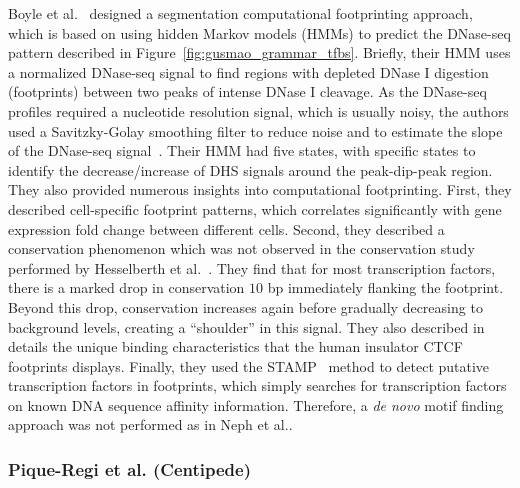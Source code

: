 Boyle et al.~\cite{boyle2011} designed a segmentation computational footprinting approach, which is based on using hidden Markov models (HMMs) to predict the DNase-seq pattern described in Figure~\ref{fig:gusmao_grammar_tfbs}. Briefly, their HMM uses a normalized DNase-seq signal to find regions with depleted DNase I digestion (footprints) between two peaks of intense DNase I cleavage. As the DNase-seq profiles required a nucleotide resolution signal, which is usually noisy, the authors used a Savitzky-Golay smoothing filter to reduce noise and to estimate the slope of the DNase-seq signal~\cite{madden1978}. Their HMM had five states, with specific states to identify the decrease/increase of DHS signals around the peak-dip-peak region. They also provided numerous insights into computational footprinting. First, they described cell-specific footprint patterns, which correlates significantly with gene expression fold change between different cells. Second, they described a conservation phenomenon which was not observed in the conservation study performed by Hesselberth et al.~\cite{hesselberth2009}. They find that for most transcription factors, there is a marked drop in conservation \approxy$10$ bp immediately flanking the footprint. Beyond this drop, conservation increases again before gradually decreasing to background levels, creating a ``shoulder'' in this signal. They also described in details the unique binding characteristics that the human insulator CTCF footprints displays. Finally, they used the STAMP~\cite{mahony2007} method to detect putative transcription factors in footprints, which simply searches for transcription factors on known DNA sequence affinity information. Therefore, a \emph{de novo} motif finding approach was not performed as in Neph et al.\cite{neph2012a}.

\subsubsection{Pique-Regi et al. (Centipede)}
\label{sec:piqueregi.2}

